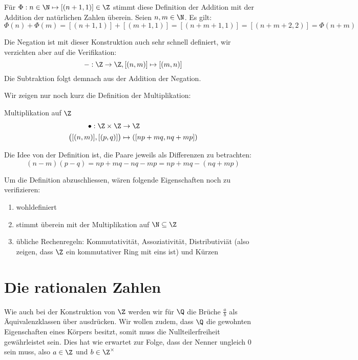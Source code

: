 Für $\Phi: n \in \N \mapsto [(n+1,1)] \in \Z$ stimmt diese Definition der Addition mit der Addition der natürlichen Zahlen überein. Seien $n,m \in \N$. Es gilt:
$$\Phi(n)+\Phi(m) = [(n+1, 1)]+[(m+1, 1)] = [(n+m+1,1)] = [(n+m+2, 2)] = \Phi(n+m)$$

Die Negation ist mit dieser Konstruktion auch sehr schnell definiert, wir verzichten aber auf die Verifikation: $$-: \Z \to \Z, [(n, m)] \mapsto [(m, n)]$$ Die Subtraktion folgt demnach aus der Addition der Negation.

Wir zeigen nur noch kurz die Definition der Multiplikation:
\begin{definition}{Multiplikation auf $\Z$}{}
\begin{align*}
    \bullet: \Z \times \Z &\to \Z\\
    \big([(n,m)], [(p, q)]\big) &\mapsto ([np + mq, nq + mp])
\end{align*}
\end{definition}
Die Idee von der Definition ist, die Paare jeweils als Differenzen zu betrachten:
$$(n-m)(p-q) = np+mq-nq-mp = np+mq - (nq + mp)$$
\begin{exercise}[Verifizierung] Um die Definition abzuschliessen, wären folgende Eigenschaften noch zu verifizieren:
\begin{enumerate}
    \item wohldefiniert
    \item stimmt überein mit der Multiplikation auf $\N \subseteq \Z$
    \item übliche Rechenregeln: Kommutativität, Assoziativität, Distributiviät (also zeigen, dass $\Z$ ein kommutativer Ring mit eins ist) und Kürzen
\end{enumerate}
\end{exercise}

\section{Die rationalen Zahlen} \label{cha_rationals}
Wie auch bei der Konstruktion von $\Z$ werden wir für $\Q$ die Brüche $\frac{a}{b}$ als Äquivalenzklassen über ausdrücken. Wir wollen zudem, dass $\Q$ die gewohnten Eigenschaften eines Körpers besitzt, somit muss die Nullteilerfreiheit gewährleistet sein. Dies hat wie erwartet zur Folge, dass der Nenner ungleich 0 sein muss, also $a \in \Z$ und $b \in \Z^\times$

